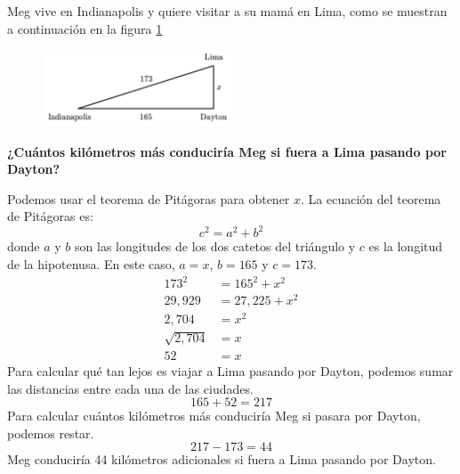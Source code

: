 Meg vive en Indianapolis y quiere visitar a su mamá en Lima,
como se muestran a continuación en la figura \ref{fig:proverb_pitagoras_07}
\begin{figure}[H]
    \begin{center}
        \includegraphics[width=0.5\textwidth]{../images/proverb_pitagoras_07}
    \end{center}
    \caption{}
    \label{fig:proverb_pitagoras_07}
\end{figure}
\textbf{¿Cuántos kilómetros más conduciría Meg si fuera a Lima pasando por Dayton?}\\


\begin{solutionbox}{12cm}
    Podemos usar el teorema de Pitágoras para obtener $x$.
    La ecuación del teorema de Pitágoras es:
    \[c^2=a^2+b^2\]
    donde $a$ y $b$ son las longitudes de los dos catetos del triángulo y $c$ es la longitud de la hipotenusa.
    En este caso, $a=x$, $b=165$ y $c=173$.
    \begin{align*}
        173^2        & =165^2+x^2     \\
        29,929       & = 27,225 + x^2 \\
        2,704        & =x^2           \\
        \sqrt{2,704} & =x             \\
        52           & = x
    \end{align*}
    Para calcular qué tan lejos es viajar a Lima pasando por Dayton, podemos sumar las distancias entre cada una de las ciudades.
    \[165+52=217\]
    Para calcular cuántos kilómetros más conduciría Meg si pasara por Dayton, podemos restar.
    \[217-173=44\]
    Meg conduciría 44 kilómetros adicionales si fuera a Lima pasando por Dayton.
\end{solutionbox}